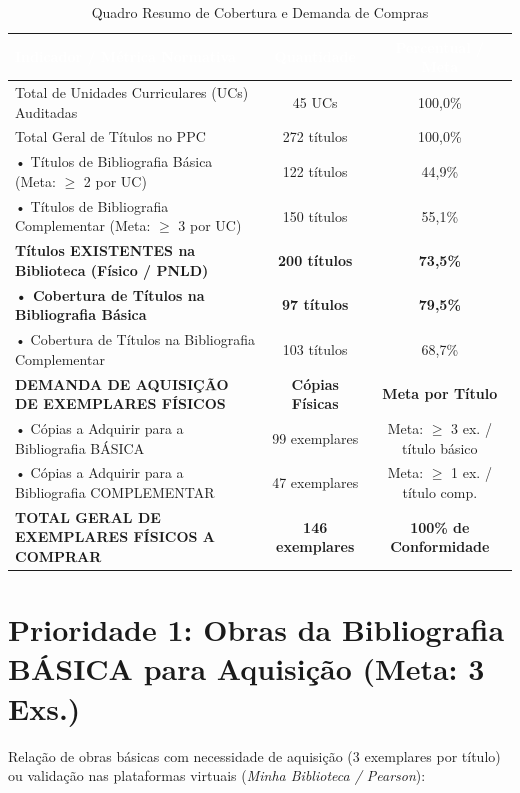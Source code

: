 \documentclass[10pt,a4paper]{article}
\begin{document}
\begin{table}[H]
\centering
\small
\begin{tabularx}{\linewidth}{|X|c|c|}
\hline
\rowcolor{ifscgreen}
\textcolor{white}{\textbf{Indicador / Métrica Normativa}} & \textcolor{white}{\textbf{Quantidade}} & \textcolor{white}{\textbf{Percentual / Meta}} \\ \hline
\rowcolor{cinzaClaro}
Total de Unidades Curriculares (UCs) Auditadas & 45 UCs & 100,0\% \\ \hline
Total Geral de Títulos no PPC & 272 títulos & 100,0\% \\ \hline
\rowcolor{cinzaClaro}
• Títulos de Bibliografia Básica (Meta: $\ge$ 2 por UC) & 122 títulos & 44,9\% \\ \hline
• Títulos de Bibliografia Complementar (Meta: $\ge$ 3 por UC) & 150 títulos & 55,1\% \\ \hline
\rowcolor{ifsclightgreen}
\textbf{Títulos EXISTENTES na Biblioteca (Físico / PNLD)} & \textbf{200 títulos} & \textbf{73,5\%} \\ \hline
\rowcolor{ifsclightgreen}
\textbf{• Cobertura de Títulos na Bibliografia Básica} & \textbf{97 títulos} & \textbf{79,5\%} \\ \hline
\rowcolor{ifsclightgreen}
• Cobertura de Títulos na Bibliografia Complementar & 103 títulos & 68,7\% \\ \hline
\rowcolor{cinzaClaro}
\textbf{DEMANDA DE AQUISIÇÃO DE EXEMPLARES FÍSICOS} & \textbf{Cópias Físicas} & \textbf{Meta por Título} \\ \hline
\rowcolor{cinzaClaro}
• Cópias a Adquirir para a Bibliografia BÁSICA & 99 exemplares & Meta: $\ge$ 3 ex. / título básico \\ \hline
• Cópias a Adquirir para a Bibliografia COMPLEMENTAR & 47 exemplares & Meta: $\ge$ 1 ex. / título comp. \\ \hline
\rowcolor{ifsclightgreen}
\textbf{TOTAL GERAL DE EXEMPLARES FÍSICOS A COMPRAR} & \textbf{146 exemplares} & \textbf{100\% de Conformidade} \\ \hline
\end{tabularx}
\caption{Quadro Resumo de Cobertura e Demanda de Compras}
\end{table}

\section{Prioridade 1: Obras da Bibliografia BÁSICA para Aquisição (Meta: 3 Exs.)}
Relação de obras básicas com necessidade de aquisição (3 exemplares por título) ou validação nas plataformas virtuais (\textit{Minha Biblioteca / Pearson}):
\end{document}
